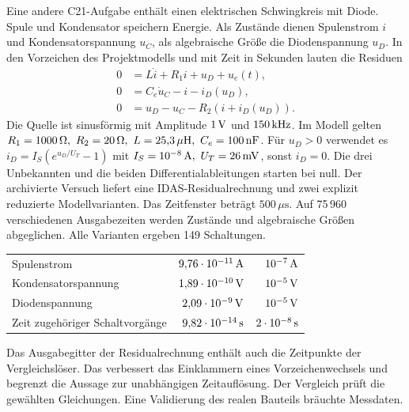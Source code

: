 Eine andere C21-Aufgabe enthält einen elektrischen Schwingkreis mit Diode. Spule und Kondensator speichern Energie. Als Zustände dienen Spulenstrom \(i\) und Kondensatorspannung \(u_C\), als algebraische Größe die Diodenspannung \(u_D\). In den Vorzeichen des Projektmodells und mit Zeit in Sekunden lauten die Residuen
\[
 \begin{aligned}
 0&=L\dot i+R_1 i+u_D+u_e(t),\\
 0&=C_e\dot u_C-i-i_D(u_D),\\
 0&=u_D-u_C-R_2(i+i_D(u_D)).
 \end{aligned}
\]
Die Quelle ist sinusförmig mit Amplitude \(1\,\mathrm{V}\) und \(150\,\mathrm{kHz}\). Im Modell gelten \(R_1=1000\,\Omega,\ R_2=20\,\Omega,\ L=25{,}3\,\mu\mathrm H,\ C_e=100\unitm{nF}\). Für \(u_D>0\) verwendet es \(i_D=I_S(e^{u_D/U_T}-1)\) mit \(I_S=10^{-8}\unitm A,\ U_T=26\unitm{mV}\), sonst \(i_D=0\). Die drei Unbekannten und die beiden Differentialableitungen starten bei null.
Der archivierte Versuch liefert eine IDAS-Residualrechnung und zwei explizit reduzierte Modellvarianten. Das Zeitfenster beträgt \(500\,\mu\mathrm s\). Auf 75\,960 verschiedenen Ausgabezeiten werden Zustände und algebraische Größen abgeglichen. Alle Varianten ergeben 149 Schaltungen.
{\tblstart\begin{tabularx}{\linewidth}{@{}Yrr@{}}\toprule
{}&&\\\midrule
Spulenstrom&\(9{,}76\cdot10^{-11}\,\mathrm{A}\)&\(10^{-7}\,\mathrm{A}\)\\
Kondensatorspannung&\(1{,}89\cdot10^{-10}\,\mathrm{V}\)&\(10^{-5}\,\mathrm{V}\)\\
Diodenspannung&\(2{,}09\cdot10^{-9}\,\mathrm{V}\)&\(10^{-5}\,\mathrm{V}\)\\
Zeit zugehöriger Schaltvorgänge&\(9{,}82\cdot10^{-14}\,\mathrm{s}\)&\(2\cdot10^{-8}\,\mathrm{s}\)\\\bottomrule
\end{tabularx}\par}
Das Ausgabegitter der Residualrechnung enthält auch die Zeitpunkte der Vergleichslöser. Das verbessert das Einklammern eines Vorzeichenwechsels und begrenzt die Aussage zur unabhängigen Zeitauflösung. Der Vergleich prüft die gewählten Gleichungen. Eine Validierung des realen Bauteils bräuchte Messdaten.

